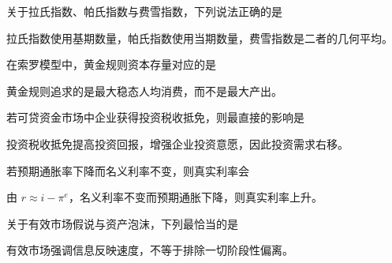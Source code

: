 \begin{question}
关于拉氏指数、帕氏指数与费雪指数，下列说法正确的是
\begin{choiceoptions}[2]
\end{choiceoptions}
\begin{solution}
拉氏指数使用基期数量，帕氏指数使用当期数量，费雪指数是二者的几何平均。
\end{solution}
\end{question}

\begin{question}
在索罗模型中，黄金规则资本存量对应的是
\begin{choiceoptions}[2]
\end{choiceoptions}
\begin{solution}
黄金规则追求的是最大稳态人均消费，而不是最大产出。
\end{solution}
\end{question}

\begin{question}
若可贷资金市场中企业获得投资税收抵免，则最直接的影响是
\begin{choiceoptions}[2]
\end{choiceoptions}
\begin{solution}
投资税收抵免提高投资回报，增强企业投资意愿，因此投资需求右移。
\end{solution}
\end{question}

\begin{question}
若预期通胀率下降而名义利率不变，则真实利率会
\begin{choiceoptions}[2]
\end{choiceoptions}
\begin{solution}
由 $r\approx i-\pi^e$，名义利率不变而预期通胀下降，则真实利率上升。
\end{solution}
\end{question}

\begin{question}
关于有效市场假说与资产泡沫，下列最恰当的是
\begin{choiceoptions}[2]
\end{choiceoptions}
\begin{solution}
有效市场强调信息反映速度，不等于排除一切阶段性偏离。
\end{solution}
\end{question}

